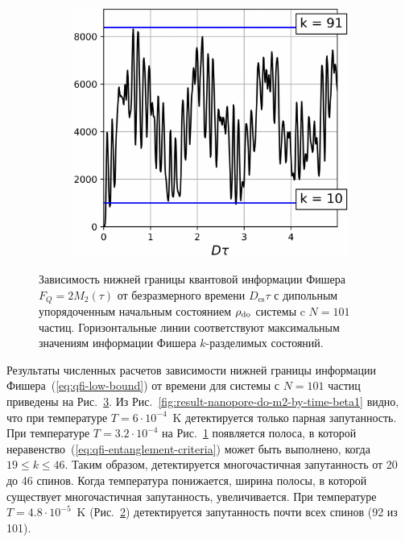 \begin{figure}[H]
\begin{subfigure}[t]{0.3\textwidth}
    \caption{\protect}
    \label{fig:result-nanopore-do-m2-by-time-beta2}
  \end{subfigure}
  \hfill
  \begin{subfigure}[t]{0.3\textwidth}
    \centering
    \includegraphics[width=\textwidth]{figures/result-nanopore-do-m2-by-time-beta3.png}
    \caption{\protect}
    \label{fig:result-nanopore-do-m2-by-time-beta3}
  \end{subfigure}
  \caption{
    Зависимость нижней границы квантовой информации Фишера $F_Q = 2M_2(\tau)$ от безразмерного времени $D_\mathrm{es}\tau$ с дипольным упорядоченным начальным состоянием $\rho_\mathrm{do}$ системы c $N=101$ частиц.
    Горизонтальные линии соответствуют максимальным значениям информации Фишера $k$-разделимых состояний.
  }
  \label{fig:result-nanopore-do-m2-by-time-betas}
\end{figure}


Результаты численных расчетов зависимости нижней границы информации Фишера~(\ref{eq:qfi-low-bound}) от времени для системы с $N=101$ частиц приведены на Рис.~\ref{fig:result-nanopore-do-m2-by-time-betas}.
Из Рис.~\ref{fig:result-nanopore-do-m2-by-time-beta1} видно,
что при температуре $T=6\cdot10^{-4}$~K детектируется только парная запутанность.
При температуре $T=3.2\cdot10^{-4}$ на Рис.~\ref{fig:result-nanopore-do-m2-by-time-beta2} появляется полоса, в которой неравенство~(\ref{eq:qfi-entanglement-criteria}) может быть выполнено, когда $19 \leq k \leq 46$.
Таким образом, детектируется многочастичная запутанность от 20 до 46 спинов.
Когда температура понижается, ширина полосы, в которой существует многочастичная запутанность, увеличивается.
При температуре $T=4.8\cdot10^{-5}$~K (Рис.~\ref{fig:result-nanopore-do-m2-by-time-beta3}) детектируется запутанность почти всех спинов (92 из 101).

